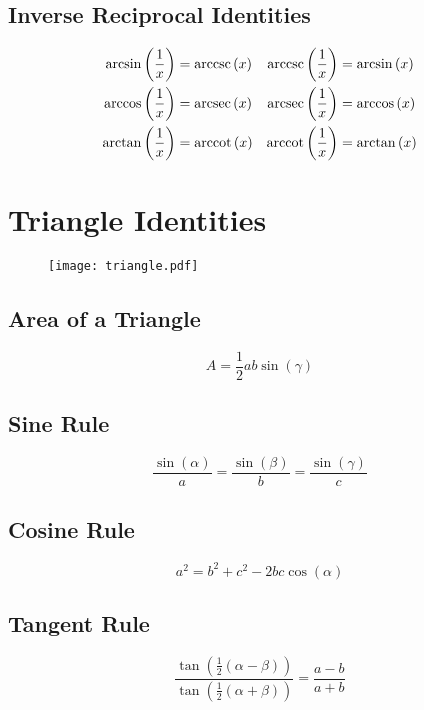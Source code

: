 \documentclass{article}
\begin{document}
\subsection{Inverse Reciprocal Identities}
\begin{align*}
    \arcsin{\left( \frac{1}{x} \right)} &= \arccsc{\left( x \right)} & \arccsc{\left( \frac{1}{x} \right)} &= \arcsin{\left( x \right)} \\
    \arccos{\left( \frac{1}{x} \right)} &= \arcsec{\left( x \right)} & \arcsec{\left( \frac{1}{x} \right)} &= \arccos{\left( x \right)} \\
    \arctan{\left( \frac{1}{x} \right)} &= \arccot{\left( x \right)} & \arccot{\left( \frac{1}{x} \right)} &= \arctan{\left( x \right)} \\
\end{align*}
\section{Triangle Identities}
\begin{figure}[H]
	\centering
	\texttt{[image: triangle.pdf]}
\end{figure}
\subsection{Area of a Triangle}
\begin{equation}
	A=\frac{1}{2}a b \sin{\left( \gamma \right)}
\end{equation}
\subsection{Sine Rule}
\begin{equation}
	\frac{\sin{\left( \alpha \right)}}{a} = \frac{\sin{\left( \beta \right)}}{b} = \frac{\sin{\left( \gamma \right)}}{c}
\end{equation}
\subsection{Cosine Rule}
\begin{equation}
	a^2=b^2+c^2-2b c\cos{\left( \alpha \right)}
\end{equation}
\subsection{Tangent Rule}
\begin{equation}
	\frac{\tan{\left( \frac{1}{2}\left( \alpha-\beta \right) \right)}}{\tan{\left( \frac{1}{2}\left( \alpha+\beta \right) \right)}} = \frac{a-b}{a+b}
\end{equation}
\end{document}
